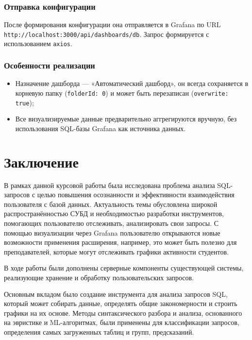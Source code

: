 \documentclass[14pt]{extarticle}
\begin{document}
\subsubsection*{Отправка конфигурации}

После формирования конфигурации она отправляется в Grafana по URL \texttt{http://localhost:3000/api/dashboards/db}. Запрос формируется с использованием \texttt{axios}.

\subsubsection*{Особенности реализации}

\begin{itemize}
  \item Назначение дашборда — «Автоматический дашборд», он всегда сохраняется в корневую папку (\texttt{folderId: 0}) и может быть перезаписан (\texttt{overwrite: true});
  \item Все визуализируемые данные предварительно аггрегируются вручную, без использования SQL-базы Grafana как источника данных.
\end{itemize}

\newpage
\section*{Заключение}

В рамках данной курсовой работы была исследована проблема анализа SQL-запросов с целью повышения осознанности и эффективности взаимодействия пользователя с базой данных. Актуальность темы обусловлена широкой распространённостью СУБД и необходимостью разработки инструментов, помогающих пользователю отслеживать, анализировать свои запросы. С помощью визуализации через Grafana пользователю открываются новые возможности применения расширения, например, это может быть полезно для преподавателей, которые могут отслеживать графики активности студентов.

В ходе работы были дополнены серверные компоненты существующей системы, реализующие хранение и обработку пользовательских запросов. 

Основным вкладом было создание инструмента для анализа запросов SQL, который может собирать данные, определять общие закономерности и строить графики на их основе. Методы синтаксического разбора и анализа, основанного на эвристике и ML-алгоритмах, были применены для классификации запросов, определения самых загруженных таблиц и групп, предсказаний.
\end{document}
